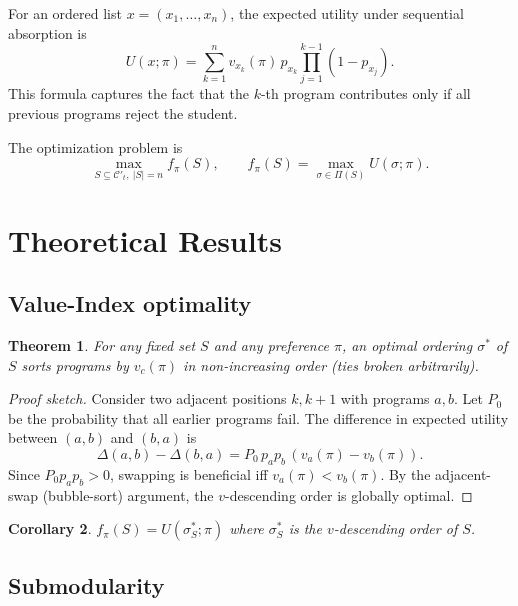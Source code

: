 \documentclass[11pt,a4paper]{article}
\newtheorem{theorem}{Theorem}[section]
\newtheorem{corollary}[theorem]{Corollary}
\begin{document}
For an ordered list $x = (x_1, \dots, x_n)$, the expected utility under sequential absorption is
\begin{equation}
  U(x; \pi) = \sum_{k=1}^{n} v_{x_k}(\pi) \, p_{x_k} \prod_{j=1}^{k-1}(1 - p_{x_j}).
  \label{eq:utility}
\end{equation}
This formula captures the fact that the $k$-th program contributes only if all previous programs reject the student.

The optimization problem is
\begin{equation}
  \max_{S \subseteq \mathcal{C}'_t, \ |S| = n} f_\pi(S),
  \qquad
  f_\pi(S) = \max_{\sigma \in \Pi(S)} U(\sigma; \pi).
  \tag{P$_\pi$}
\end{equation}

\section{Theoretical Results}\label{sec:theory}

\subsection{Value-Index optimality}

\begin{theorem}\label{thm:value-index}
For any fixed set $S$ and any preference $\pi$, an optimal ordering $\sigma^*$ of $S$ sorts programs by $v_c(\pi)$ in non-increasing order (ties broken arbitrarily).
\end{theorem}

\begin{proof}[Proof sketch]
Consider two adjacent positions $k, k+1$ with programs $a, b$. Let $P_0$ be the probability that all earlier programs fail. The difference in expected utility between $(a,b)$ and $(b,a)$ is
\[
\Delta(a,b) - \Delta(b,a) = P_0 \, p_a p_b \, (v_a(\pi) - v_b(\pi)).
\]
Since $P_0 p_a p_b > 0$, swapping is beneficial iff $v_a(\pi) < v_b(\pi)$. By the adjacent-swap (bubble-sort) argument, the $v$-descending order is globally optimal.
\end{proof}

\begin{corollary}
$f_\pi(S) = U(\sigma^*_S; \pi)$ where $\sigma^*_S$ is the $v$-descending order of $S$.
\end{corollary}

\subsection{Submodularity}
\end{document}
